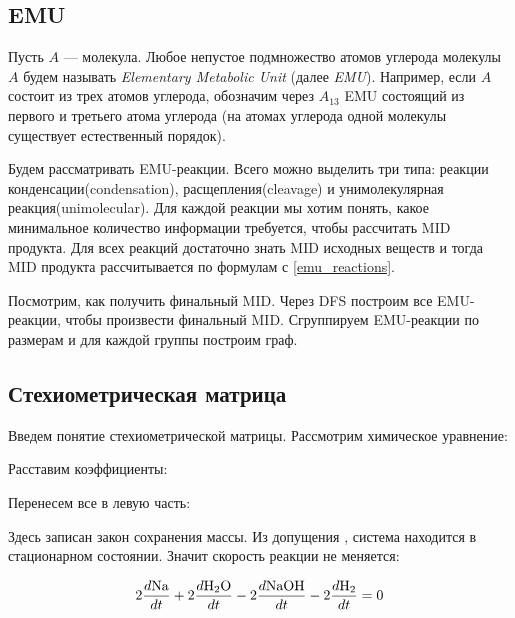 \documentclass[a4paper, 12pt, left=30mm, right=15mm, top=20mm, bottom=20mm]{report}
\begin{document}
\subsection{EMU}


Пусть $A$ --- молекула. Любое непустое подмножество атомов углерода молекулы $A$ будем называть \emph{Elementary Metabolic Unit} (далее \emph{EMU}). Например, если $A$ состоит из трех атомов углерода, обозначим через $A_{13}$ EMU состоящий из первого и третьего атома углерода (на атомах углерода одной молекулы существует естественный порядок).

Будем рассматривать EMU-реакции. Всего можно выделить три типа: реакции конденсации(condensation), расщепления(cleavage) и унимолекулярная реакция(unimolecular). Для каждой реакции мы хотим понять, какое минимальное количество информации требуется, чтобы рассчитать MID продукта. Для всех реакций достаточно знать MID исходных веществ и тогда MID продукта рассчитывается по формулам с \ref{emu_reactions}.

Посмотрим, как получить финальный MID. Через DFS построим все EMU-реакции, чтобы произвести финальный MID. Сгруппируем EMU-реакции по размерам и для каждой группы построим граф.

\clearpage
\subsection{Стехиометрическая матрица}

Введем понятие стехиометрической матрицы. Рассмотрим химическое уравнение:

\begin{center}
\end{center}

Расставим коэффициенты:

\begin{center}
\end{center}

Перенесем все в левую часть:

\begin{center}
\end{center}
Здесь записан закон сохранения массы.
Из допущения , система находится в стационарном состоянии. Значит скорость реакции не меняется:
\begin{center}
	$$2\frac{d\ce{Na}}{dt} + 2\frac{d\ce{H_2O}}{dt} - 2\frac{d\ce{NaOH}}{dt} - 2\frac{d\ce{H_2}}{dt} = 0$$
\end{center}
\end{document}
